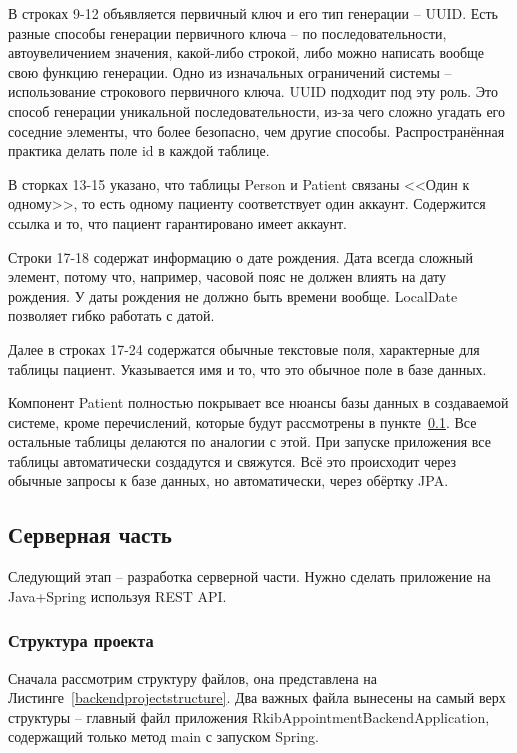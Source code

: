 \documentclass[a4paper,article]{article}
\begin{document}
\begin{sloppypar}
    В строках 9-12 объявляется первичный ключ и его тип генерации -- UUID. Есть разные способы генерации первичного ключа -- по последовательности, автоувеличением значения, какой-либо строкой, либо можно написать вообще свою функцию генерации. Одно из изначальных ограничений системы -- использование строкового первичного ключа. UUID подходит под эту роль. Это способ генерации уникальной последовательности, из-за чего сложно угадать его соседние элементы, что более безопасно, чем другие способы. Распространённая практика делать поле id в каждой таблице.

    В сторках 13-15 указано, что таблицы Person и Patient связаны <<Один к одному>>, то есть одному пациенту соответствует один аккаунт. Содержится ссылка и то, что пациент гарантировано имеет аккаунт.

    Строки 17-18 содержат информацию о дате рождения. Дата всегда сложный элемент, потому что, например, часовой пояс не должен влиять на дату рождения. У даты рождения не должно быть времени вообще. LocalDate позволяет гибко работать с датой.

    Далее в строках 17-24 содержатся обычные текстовые поля, характерные для таблицы пациент. Указывается имя и то, что это обычное поле в базе данных.

    Компонент Patient полностью покрывает все нюансы базы данных в создаваемой системе, кроме перечислений, которые будут рассмотрены в пункте~\ref{Реализация. Серверная часть}. Все остальные таблицы делаются по аналогии с этой. При запуске приложения все таблицы автоматически создадутся и свяжутся. Всё это происходит через обычные запросы к базе данных, но автоматически, через обёртку JPA.

    \subsection{Серверная часть}\label{Реализация. Серверная часть}

    Следующий этап -- разработка серверной части. Нужно сделать приложение на Java+Spring используя REST API.

    \subsubsection{Структура проекта}

    Сначала рассмотрим структуру файлов, она представлена на Листинге~\ref{backendprojectstructure}. Два важных файла вынесены на самый верх структуры -- главный файл приложения RkibAppointmentBackendApplication, содержащий только метод main с запуском Spring.


\end{sloppypar}
\end{document}
